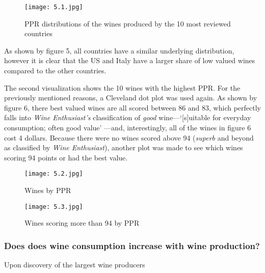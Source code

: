 \begin{figure}[h]
  \texttt{[image: 5.1.jpg]}
  \caption{PPR distributions of the wines produced by the 10 most reviewed countries} %
\end{figure}

As shown by figure 5, all countries have a similar underlying distribution, however it is clear that the US and Italy have a larger share of low valued wines compared to the other countries.

The second visualization shows the 10 wines with the highest PPR. For the previously mentioned reasons, a Cleveland dot plot was used again. As shown by figure 6, there best valued wines are all scored between 86 and 83, which perfectly falls into \emph{Wine Enthusiast's} classification of \emph{good} wine---`[s]uitable for everyday consumption; often good value' \cite{WineMag}---and, interestingly, all of the wines in figure 6 cost 4 dollars. Because there were no wines scored above 94 (\emph{superb} and beyond as classified by \emph{Wine Enthusiast}), another plot was made to see which wines scoring 94 points or had the best value.

\begin{figure}[h]
  \texttt{[image: 5.2.jpg]}
  \caption{Wines by PPR}
\end{figure}

\begin{figure}[h]
  \texttt{[image: 5.3.jpg]}
  \caption{Wines scoring more than 94 by PPR}
\end{figure}

\subsubsection{Does does wine consumption increase with wine production?}

Upon discovery of the largest wine producers 


    
